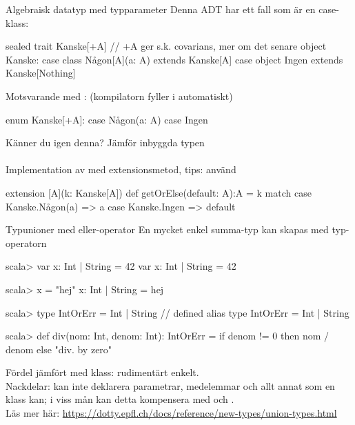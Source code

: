 \begin{Slide}{Algebraisk datatyp med typparameter}\SlideFontSmall
Denna ADT har ett fall som är en  case-klass:     
\begin{Code}
sealed trait Kanske[+A]   // +A ger s.k. covarians, mer om det senare
object Kanske:
  case class Någon[A](a: A) extends Kanske[A]
  case object Ingen extends Kanske[Nothing]   
\end{Code}
Motsvarande med : (kompilatorn fyller i  automatiskt)
\begin{Code}
enum Kanske[+A]:
  case Någon(a: A)
  case Ingen     
\end{Code}
Känner du igen denna? \pause Jämför inbyggda typen \\~\\Implementation av  med extensionsmetod, tips: använd  \pause
\begin{Code}
extension [A](k: Kanske[A]) def getOrElse(default: A):A = k match 
  case Kanske.Någon(a) => a
  case Kanske.Ingen => default
\end{Code}     
\end{Slide}

\begin{Slide}{Typunioner med eller-operator}\SlideFontSmall
En mycket enkel summa-typ kan skapas med typ-operatorn \code{|} 
\begin{REPLsmall}
scala> var x: Int | String = 42
var x: Int | String = 42

scala> x = "hej" 
x: Int | String = hej

scala> type IntOrErr = Int | String
// defined alias type IntOrErr = Int | String

scala> def div(nom: Int, denom: Int): IntOrErr = 
         if denom != 0 then nom / denom else "div. by zero"
\end{REPLsmall}
Fördel jämfört med klass: rudimentärt enkelt.\\ Nackdelar: kan inte deklarera parametrar, medelemmar och allt annat som en klass kan; i viss mån kan detta kompensera med  och .\\ 
{\SlideFontTiny Läs mer här:
\url{https://dotty.epfl.ch/docs/reference/new-types/union-types.html}
}
\end{Slide}